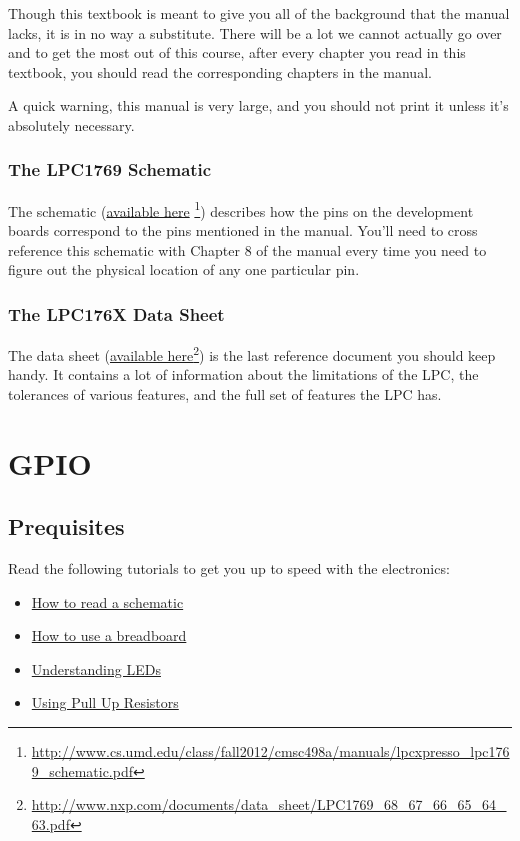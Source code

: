 \documentclass[]{article}
\begin{document}
Though this textbook is meant to give you all of the background that the
manual lacks, it is in no way a substitute. There will be a lot we
cannot actually go over and to get the most out of this course, after
every chapter you read in this textbook, you should read the
corresponding chapters in the manual.

A quick warning, this manual is very large, and you should not print it
unless it's absolutely necessary.

\subsubsection{The LPC1769 Schematic}

The schematic
(\href{http://www.cs.umd.edu/class/fall2012/cmsc498a/manuals/lpcxpresso_lpc1769_schematic.pdf}{available
here} \footnote{\url{http://www.cs.umd.edu/class/fall2012/cmsc498a/manuals/lpcxpresso_lpc1769_schematic.pdf}})
describes how the pins on the development boards correspond to the pins
mentioned in the manual. You'll need to cross reference this schematic
with Chapter 8 of the manual every time you need to figure out the
physical location of any one particular pin.

\subsubsection{The LPC176X Data Sheet}

The data sheet
(\href{http://www.nxp.com/documents/data_sheet/LPC1769_68_67_66_65_64_63.pdf}{available
here}\footnote{\url{http://www.nxp.com/documents/data_sheet/LPC1769_68_67_66_65_64_63.pdf}})
is the last reference document you should keep handy. It contains a lot
of information about the limitations of the LPC, the tolerances of
various features, and the full set of features the LPC has.

\newpage

\section{GPIO}

\subsection{Prequisites}

Read the following tutorials to get you up to speed with the
electronics:

\begin{itemize}
\itemsep1pt\parskip0pt
\item
  \href{https://learn.sparkfun.com/tutorials/how-to-read-a-schematic}{How
  to read a schematic}
\item
  \href{https://learn.sparkfun.com/tutorials/how-to-use-a-breadboard/introduction}{How
  to use a breadboard}
\item
  \href{https://learn.sparkfun.com/tutorials/light-emitting-diodes-leds}{Understanding
  LEDs}
\item
  \href{https://learn.sparkfun.com/tutorials/pull-up-resistors/introduction}{Using
  Pull Up Resistors}
\end{itemize}
\end{document}

